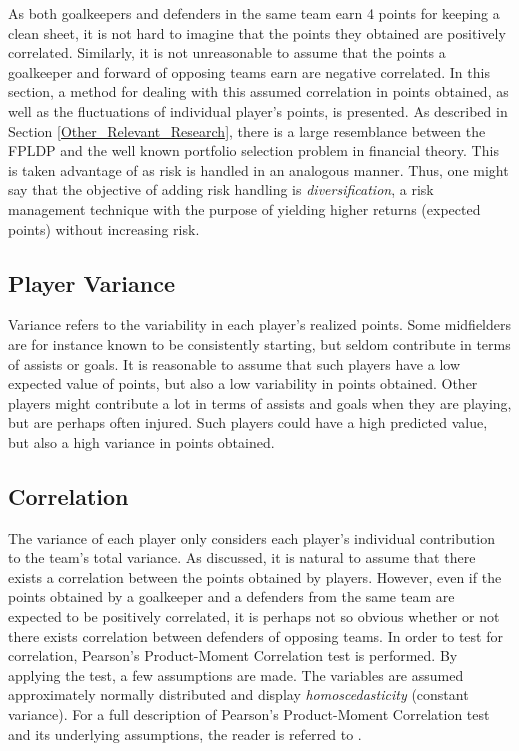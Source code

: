 As both goalkeepers and defenders in the same team earn 4 points for keeping a clean sheet, it is not hard to imagine that the points they obtained are positively correlated. Similarly, it is not unreasonable to assume that the points a goalkeeper and forward of opposing teams earn are negative correlated. In this section, a method for dealing with this assumed correlation in points obtained, as well as the fluctuations of individual player's points, is presented. As described in Section \ref{Other_Relevant_Research}, there is a large resemblance between the FPLDP and the well known portfolio selection problem in financial theory. This is taken advantage of as risk is handled in an analogous manner. Thus, one might say that the objective of adding risk handling is \textit{diversification}, a risk management technique with the purpose of yielding higher returns (expected points) without increasing risk.



\subsection{Player Variance}

Variance refers to the variability in each player's realized points. Some midfielders are for instance known to be consistently starting, but seldom contribute in terms of assists or goals. It is reasonable to assume that such players have a low expected value of points, but also a low variability in points obtained. Other players might contribute a lot in terms of assists and goals when they are playing, but are perhaps often injured. Such players could have a high predicted value, but also a high variance in points obtained. 

\subsection{Correlation}

The variance of each player only considers each player's individual contribution to the team's total variance. As discussed, it is natural to assume that there exists a correlation between the points obtained by players. However, even if the points obtained by a goalkeeper and a defenders from the same team are expected to be positively correlated, it is perhaps not so obvious whether or not there exists correlation between defenders of opposing teams. In order to test for correlation, Pearson's Product-Moment Correlation test is performed. By applying the test, a few assumptions are made. The variables are assumed approximately normally distributed and display \textit{homoscedasticity} (constant variance). For a full description of Pearson's Product-Moment Correlation test and its underlying assumptions, the reader is referred to \cite{laerd}. 


